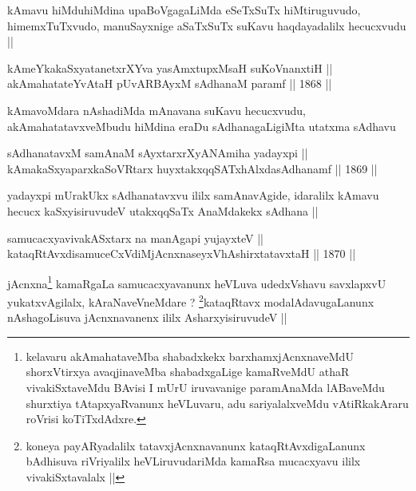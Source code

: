 \begin{artha}
kAmavu hiMduhiMdina upaBoVgagaLiMda eSeTxSuTx hiMtiruguvudo,
himemxTuTxvudo, manuSayxnige aSaTxSuTx suKavu haqdayadalilx
hecucxvudu ||
\end{artha}

\begin{shl}
kAmeYkakaSxyatanetxrXYva yasAmxtupxMsaH suKoVnanxtiH || \\
akAmahatateYvAtaH pUvARBAyxM sAdhanaM paramf ||  1868 ||  
\end{shl}

\begin{artha}
kAmavoMdara nAshadiMda mAnavana suKavu hecucxvudu,
akAmahatatavxveMbudu hiMdina eraDu sAdhanagaLigiMta utatxma sAdhavu 
\end{artha}


\begin{shl}
sAdhanatavxM samAnaM sAyxtarxrXyANAmiha yadayxpi || \\
kAmakaSxyaparxkaSoVR\s tarx huyxtakxqqSATxhAlxdasAdhanamf ||  1869 ||  
\end{shl}

\begin{artha}
yadayxpi mUrakUkx sAdhanatavxvu ililx samAnavAgide, idaralilx kAmavu
hecucx kaSxyisiruvudeV utakxqqSaTx AnaMdakekx sAdhana ||
\end{artha}

\begin{shl}
samucacxyavivakASx\s tarx na manAgapi yujayxteV || \\
kataqRtAvxdisamuceCxVdiMjAcnxnaseyxVhA\s \s shirxtatavxtaH ||  1870 ||  
\end{shl}

\begin{artha}
jAcnxna\footnote[1]{kelavaru akAmahataveMba shabadxkekx
  barxhamxjAcnxnaveMdU shorxVtirxya avaqjinaveMba shabadxgaLige
  kamaRveMdU athaR vivakiSxtaveMdu BAvisi I mUrU iruvavanige
  paramAnaMda lABaveMdu shurxtiya tAtapxyaRvanunx heVLuvaru, adu
  sariyalalxveMdu vAtiRkakAraru roVrisi koTiTxdAdxre.} kamaRgaLa samucacxyavanunx heVLuva udedxVshavu savxlapxvU
yukatxvAgilalx, kAraNaveVneMdare ? \footnote[2]{koneya payARyadalilx
  tatavxjAcnxnavanunx kataqRtAvxdigaLanunx bAdhisuva riVriyalilx
  heVLiruvudariMda kamaRsa mucacxyavu ililx vivakiSxtavalalx ||}kataqRtavx
modalAdavugaLanunx nAshagoLisuva jAcnxnavanenx ililx AsharxyisiruvudeV ||
\end{artha}

